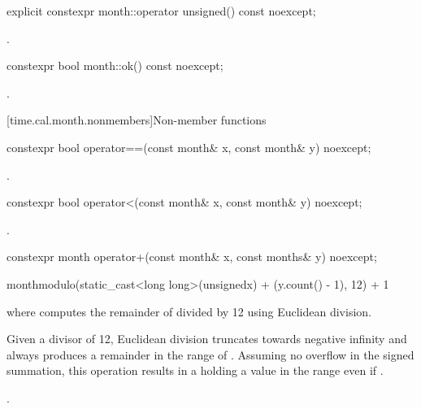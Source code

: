 %
\begin{itemdecl}
explicit constexpr month::operator unsigned() const noexcept;
\end{itemdecl}

\begin{itemdescr}
\pnum
\returns {}.
\end{itemdescr}

%
\begin{itemdecl}
constexpr bool month::ok() const noexcept;
\end{itemdecl}

\begin{itemdescr}
\pnum
\returns {}.
\end{itemdescr}

[time.cal.month.nonmembers]{Non-member functions}

%
\begin{itemdecl}
constexpr bool operator==(const month& x, const month& y) noexcept;
\end{itemdecl}

\begin{itemdescr}
\pnum
\returns {}.
\end{itemdescr}

%
\begin{itemdecl}
constexpr bool operator<(const month& x, const month& y) noexcept;
\end{itemdecl}

\begin{itemdescr}
\pnum
\returns {}.
\end{itemdescr}

%
\begin{itemdecl}
constexpr month operator+(const month& x, const months& y) noexcept;
\end{itemdecl}

\begin{itemdescr}
\pnum
\returns
\begin{codeblock}
month{modulo(static_cast<long long>(unsigned{x}) + (y.count() - 1), 12) + 1}
\end{codeblock}
where  computes the remainder of  divided by 12 using Euclidean division.
\begin{note}
Given a divisor of 12, Euclidean division truncates towards negative infinity and
always produces a remainder in the range of .
Assuming no overflow in the signed summation,
this operation results in a  holding a value in the range  even if .
\end{note}
\begin{example}
.
\end{example}
\end{itemdescr}

